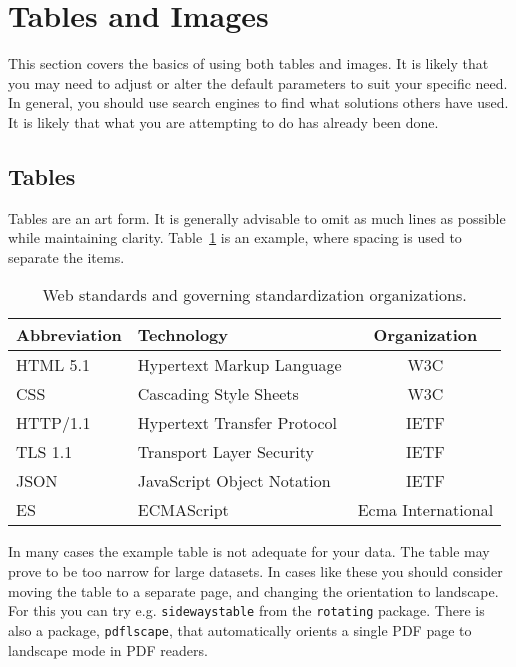 \documentclass[english]{jamk-report}
\begin{document}
\section{Tables and Images}


This section covers the basics of using both tables and images. It is likely
that you may need to adjust or alter the default parameters to suit your
specific need. In general, you should use search
engines to find what solutions others have used. It is likely that
what you are attempting to do has already been done.

\subsection{Tables}

Tables are an art form. It is generally advisable to omit as much lines
as possible while maintaining clarity. Table~\ref{table:web} is an example,
where spacing is used to separate the items. 

\begin{table}[h]\centering
{}
    \begin{tabularx}{\textwidth-1em}{llc} \toprule
        Abbreviation & Technology & Organization  \\ \midrule
        HTML 5.1 & Hypertext Markup Language & W3C \\
        CSS  & Cascading Style Sheets & W3C  \\
        HTTP/1.1& Hypertext Transfer Protocol &  IETF \\
        TLS 1.1 & Transport Layer Security & IETF \\
        JSON & JavaScript Object Notation & IETF \\
        ES & ECMAScript & Ecma International \\
        \bottomrule
    \end{tabularx}
\caption{Web standards and governing standardization organizations.}
\label{table:web}
\end{table}

\noindent
In many cases the example table is not adequate for your data. The table
may prove to be too narrow for large datasets. In cases like these you
should consider moving the table to a separate page, and changing the
orientation to landscape. For this you can try e.g. \texttt{sidewaystable} 
from the \texttt{rotating} package. There is also a package, \texttt{pdflscape}, that automatically
orients a single PDF page to landscape mode in PDF readers.
\end{document}
